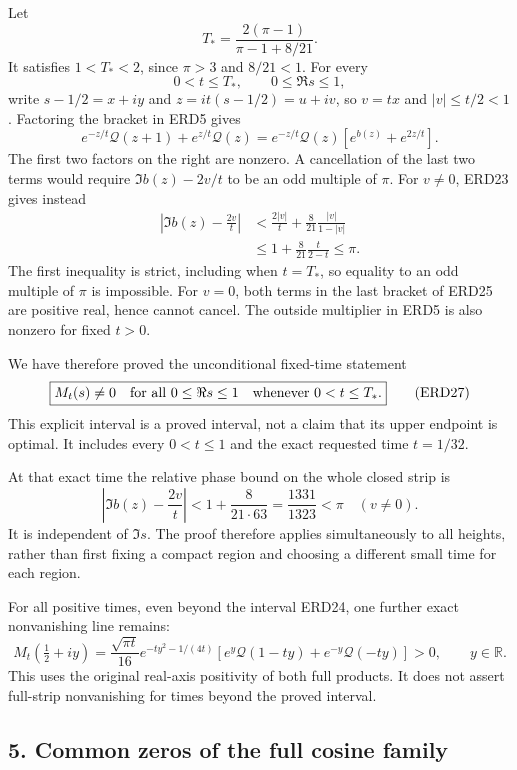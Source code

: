 \documentclass[
  10pt,
  a4paper,
]{article}
\begin{document}
Let \[
 T_*=\frac{2(\pi-1)}{\pi-1+8/21}.
 \tag{ERD24}
\] It satisfies \(1<T_*<2\), since \(\pi>3\) and \(8/21<1\). For every
\[
 0<t\le T_*,\qquad 0\le\Re s\le1,
\] write \(s-1/2=x+iy\) and \(z=it(s-1/2)=u+iv\), so \(v=tx\) and
\(|v|\le t/2<1\). Factoring the bracket in ERD5 gives \[
 e^{-z/t}\mathcal Q(z+1)+e^{z/t}\mathcal Q(z)
     =e^{-z/t}\mathcal Q(z)
                  [e^{b(z)}+e^{2z/t}].
 \tag{ERD25}
\] The first two factors on the right are nonzero. A cancellation of the
last two terms would require \(\Im b(z)-2v/t\) to be an odd multiple of
\(\pi\). For \(v\ne0\), ERD23 gives instead \[
 \begin{aligned}
 \left|\Im b(z)-\frac{2v}{t}\right|
 &<\frac{2|v|}{t}
       +\frac8{21}\frac{|v|}{1-|v|}\\
 &\le1+\frac8{21}\frac{t}{2-t}
 \le\pi .
 \end{aligned}
 \tag{ERD26}
\] The first inequality is strict, including when \(t=T_*\), so equality
to an odd multiple of \(\pi\) is impossible. For \(v=0\), both terms in
the last bracket of ERD25 are positive real, hence cannot cancel. The
outside multiplier in ERD5 is also nonzero for fixed \(t>0\).

We have therefore proved the unconditional fixed-time statement \[
 \boxed{\displaystyle
 M_t(s)\ne0
 \quad\hbox{for all }0\le\Re s\le1
 \quad\hbox{whenever }0<t\le T_*.}
 \tag{ERD27}
\] This explicit interval is a proved interval, not a claim that its
upper endpoint is optimal. It includes every \(0<t\le1\) and the exact
requested time \(t=1/32\).

At that exact time the relative phase bound on the whole closed strip is
\[
 \left|\Im b(z)-\frac{2v}{t}\right|
       <1+\frac8{21\cdot63}
        =\frac{1331}{1323}<\pi
 \quad(v\ne0).
 \tag{ERD28}
\] It is independent of \(\Im s\). The proof therefore applies
simultaneously to all heights, rather than first fixing a compact region
and choosing a different small time for each region.

For all positive times, even beyond the interval ERD24, one further
exact nonvanishing line remains: \[
 M_t(\tfrac12+iy)
  =\frac{\sqrt{\pi t}}{16}e^{-ty^2-1/(4t)}
       \left[e^y\mathcal Q(1-ty)+e^{-y}\mathcal Q(-ty)\right]
       >0,\qquad y\in\mathbb R.
 \tag{ERD29}
\] This uses the original real-axis positivity of both full products. It
does not assert full-strip nonvanishing for times beyond the proved
interval.

\subsection{5. Common zeros of the full cosine
family}\label{common-zeros-of-the-full-cosine-family}
\end{document}
